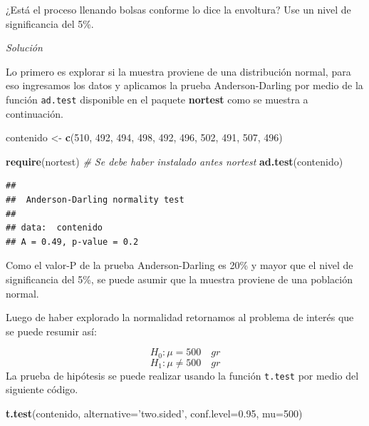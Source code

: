 \documentclass[10pt,]{krantz}
\makeatletter
\newenvironment{Shaded}{\begin{snugshade}}{\end{snugshade}}
\newcommand{\KeywordTok}[1]{\textcolor[rgb]{0.13,0.29,0.53}{\textbf{#1}}}
\newcommand{\DataTypeTok}[1]{\textcolor[rgb]{0.13,0.29,0.53}{#1}}
\newcommand{\DecValTok}[1]{\textcolor[rgb]{0.00,0.00,0.81}{#1}}
\newcommand{\FloatTok}[1]{\textcolor[rgb]{0.00,0.00,0.81}{#1}}
\newcommand{\StringTok}[1]{\textcolor[rgb]{0.31,0.60,0.02}{#1}}
\newcommand{\CommentTok}[1]{\textcolor[rgb]{0.56,0.35,0.01}{\textit{#1}}}
\newcommand{\NormalTok}[1]{#1}
\newenvironment{kframe}{%
\medskip{}
\setlength{\fboxsep}{.8em}
 \def\at@end@of@kframe{}%
 \ifinner\ifhmode%
  \def\at@end@of@kframe{\end{minipage}}%
  \begin{minipage}{\columnwidth}%
 \fi\fi%
 \def\FrameCommand##1{\hskip\@totalleftmargin \hskip-\fboxsep
 \colorbox{shadecolor}{##1}\hskip-\fboxsep
     \hskip-\linewidth \hskip-\@totalleftmargin \hskip\columnwidth}%
 \MakeFramed {\advance\hsize-\width
   \@totalleftmargin\z@ \linewidth\hsize
   \@setminipage}}%
 {\par\unskip\endMakeFramed%
 \at@end@of@kframe}
\renewenvironment{Shaded}{\begin{kframe}}{\end{kframe}}
\makeatother
\begin{document}
¿Está el proceso llenando bolsas conforme lo dice la envoltura? Use un
nivel de significancia del 5\%.

\emph{Solución}

Lo primero es explorar si la muestra proviene de una distribución
normal, para eso ingresamos los datos y aplicamos la prueba
Anderson-Darling por medio de la función \texttt{ad.test} disponible en
el paquete \textbf{nortest} \citep{R-nortest} como se muestra a
continuación.

\begin{Shaded}
\begin{Highlighting}[]
\NormalTok{contenido <-}\StringTok{ }\KeywordTok{c}\NormalTok{(}\DecValTok{510}\NormalTok{, }\DecValTok{492}\NormalTok{, }\DecValTok{494}\NormalTok{, }\DecValTok{498}\NormalTok{, }\DecValTok{492}\NormalTok{,}
               \DecValTok{496}\NormalTok{, }\DecValTok{502}\NormalTok{, }\DecValTok{491}\NormalTok{, }\DecValTok{507}\NormalTok{, }\DecValTok{496}\NormalTok{) }

\KeywordTok{require}\NormalTok{(nortest) }\CommentTok{# Se debe haber instalado antes nortest}
\KeywordTok{ad.test}\NormalTok{(contenido)}
\end{Highlighting}
\end{Shaded}

\begin{verbatim}
## 
##  Anderson-Darling normality test
## 
## data:  contenido
## A = 0.49, p-value = 0.2
\end{verbatim}

Como el valor-P de la prueba Anderson-Darling es 20\% y mayor que el
nivel de significancia del 5\%, se puede asumir que la muestra proviene
de una población normal.

Luego de haber explorado la normalidad retornamos al problema de interés
que se puede resumir así:

\[H_0: \mu = 500 \quad gr\] \[H_1: \mu \neq 500 \quad gr\] La prueba de
hipótesis se puede realizar usando la función \texttt{t.test} por medio
del siguiente código.

\begin{Shaded}
\begin{Highlighting}[]
\KeywordTok{t.test}\NormalTok{(contenido, }\DataTypeTok{alternative=}\StringTok{'two.sided'}\NormalTok{,}
       \DataTypeTok{conf.level=}\FloatTok{0.95}\NormalTok{, }\DataTypeTok{mu=}\DecValTok{500}\NormalTok{)}
\end{Highlighting}
\end{Shaded}
\end{document}
